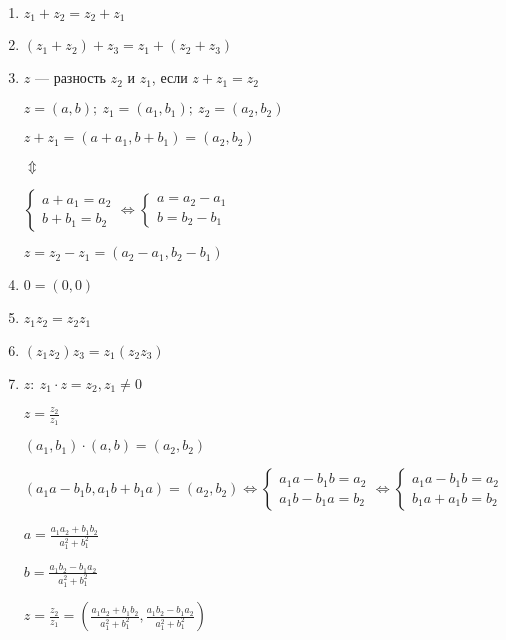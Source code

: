 \documentclass{article}
\begin{document}
    \begin{enumerate}
        \item \( z_1 + z_2 = z_2 + z_1 \)
        \item \( (z_1 + z_2) + z_3 = z_1 + (z_2 + z_3) \)
        \item \(z\) --- разность \(z_2\) и \(z_1\), если \(z+z_1 = z_2\)
        
        \(z = (a, b);\ z_1 = (a_1, b_1);\ z_2 = (a_2, b_2)\)

        \(z + z_1 = (a+a_1, b + b_1) = (a_2, b_2)\)

        \( \Updownarrow \)

        \( \begin{cases}
            a + a_1 = a_2\\
            b + b_1 = b_2
        \end{cases} \Leftrightarrow \begin{cases}
            a = a_2 - a_1\\
            b = b_2 - b_1
        \end{cases} \)
        
        \(z = z_2 - z_1 = (a_2 - a_1, b_2 - b_1)\)

        \item \( 0 = (0, 0) \)
        \item \(z_1z_2 = z_2z_1\)
        \item \((z_1z_2)z_3 = z_1(z_2z_3)\)
        \item \( z:\ z_1 \cdot z = z_2, z_1 \neq 0 \)
        
        \( z = \frac{z_2}{z_1} \)

        \( (a_1, b_1) \cdot (a, b) = (a_2, b_2) \)

        \( (a_1a - b_1b, a_1b + b_1a) = (a_2, b_2) \Leftrightarrow
        \begin{cases}
            a_1a - b_1b = a_2\\
            a_1b - b_1a = b_2    
        \end{cases} \Leftrightarrow \begin{cases}
            a_1a-b_1b=a_2\\ b_1a+a_1b=b_2
        \end{cases}\)

        \(a = \frac{a_1a_2+b_1b_2}{a_1^2+b_1^2} \)    
        
        \(b = \frac{a_1b_2-b_1a_2}{a_1^2+b_1^2}\)    

        \( z=\frac{z_2}{z_1} = (\frac{a_1a_2 + b_1b_2}{a_1^2 + b_1^2}, \frac{a_1b_2 - b_1a_2}{a_1^2 + b_1^2}) \)
    \end{enumerate}
\end{document}
